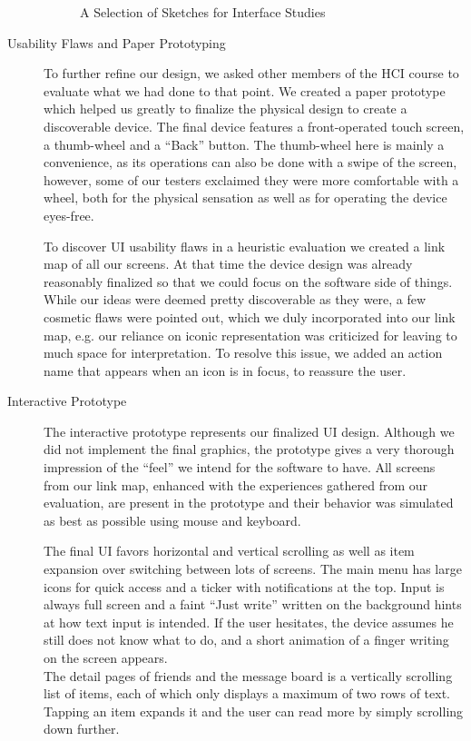 \begin{description}
\begin{figure}[h]
\begin{center}
  \end{center}
  \caption{A Selection of Sketches for Interface Studies}
  \label{fig:sketches}
\end{figure}
  \item[Usability Flaws and Paper Prototyping]
    To further refine our design, we asked other members of the HCI course
    to evaluate what we had done to that point. We created a paper prototype
    which helped us greatly to finalize the physical design to create 
    a discoverable device. The final device features a front-operated touch
    screen, a thumb-wheel and a ``Back'' button. The thumb-wheel here is 
    mainly a convenience, as its operations can also be done with a swipe
    of the screen, however, some of our testers exclaimed they were more
    comfortable with a wheel, both for the physical sensation as well 
    as for operating the device eyes-free.

    To discover UI usability flaws in a heuristic evaluation we 
    created a link map
    of all our screens. At that time the device design was already 
    reasonably finalized so that we could focus on the software side of
    things. While our ideas were deemed pretty discoverable as they were, 
    a few cosmetic flaws were pointed out, which we duly incorporated into
    our link map, e.g. our reliance on iconic representation was criticized
    for leaving to much space for interpretation. To resolve this issue, 
    we added an action name that appears when an icon is in focus, to 
    reassure the user.
  \item[Interactive Prototype]
    The interactive prototype represents our finalized UI design. Although
    we did not implement the final graphics, the prototype gives a very 
    thorough impression of the ``feel'' we intend for the software to have.
    All screens from our link map, enhanced with the experiences gathered 
    from our evaluation, are present in the prototype and their behavior 
    was simulated as best as possible using mouse and keyboard.

    The final UI favors horizontal and vertical scrolling as well as item
    expansion over switching between lots of screens. The main menu has 
    large icons for quick access and a ticker with notifications at the top.
    Input is always full screen and a faint ``Just write'' written on the
    background hints at how text input is intended. If the user hesitates,
    the device assumes he still does not know what to do, and a short 
    animation of a finger writing on the screen appears.\\ 
    The detail pages of friends and the message board is a vertically 
    scrolling list of items, each of which only displays a maximum of 
    two rows of text. Tapping an item expands it and the user can read 
    more by simply scrolling down further.


\end{description}
